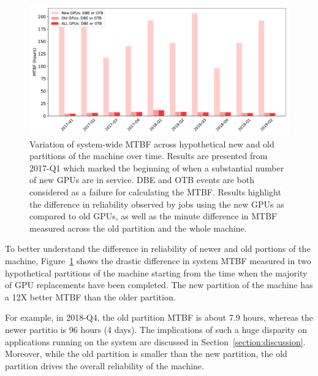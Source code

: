 \begin{figure}[bt]
  \begin{center}
    \includegraphics[width=\columnwidth]{figs/MTBF_quaterly_sys_NewOldALL.pdf}
  \end{center}
  \caption{Variation of system-wide MTBF across hypothetical new and old partitions of the machine over time.
Results are presented from 2017-Q1 which marked the beginning of when a substantial number of new GPUs are in service.
DBE and OTB events are both considered as a failure for calculating the MTBF.
Results highlight the difference in reliability observed by jobs using the new GPUs as compared to old GPUs,
as well as the minute difference in MTBF measured across the old partition and the whole machine.}
  \label{fig:MTBF_sys_NewOld}
\end{figure}

To better understand the difference in reliability of newer and old portions of the machine, 
Figure~\ref{fig:MTBF_sys_NewOld} shows the drastic difference in system MTBF measured in two hypothetical
partitions of the machine starting from the time when the majority of GPU replacements have been completed. 
The new partition of the machine has a 12X better MTBF than the older
partition.

For example, in 2018-Q4, the old partition MTBF is about 7.9 hours,
whereas the newer partitio is 96 hours (4 days). The implications of such a huge disparity on applications running on the 
system are discussed in
Section~\ref{section:discussion}. Moreover, while the old partition is
smaller than the new partition, the old partition drives the overall reliability of
the machine.
